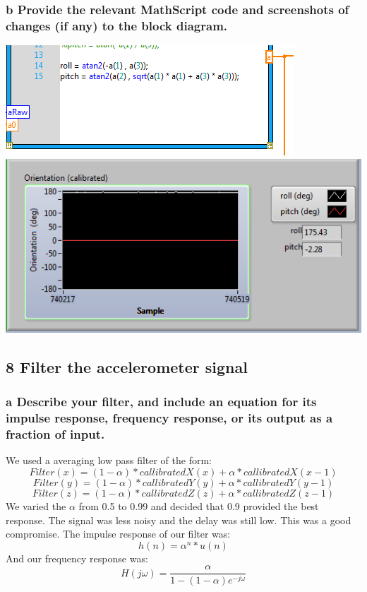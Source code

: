 \documentclass[10pt,a4paper]{article}
\begin{document}
    \subsubsection*{b Provide the relevant MathScript code and screenshots of changes (if any) to the block diagram.}
    \includegraphics{../lab1_data/lab1_7a.PNG} \\[1em] 
    \includegraphics{../lab1_data/lab1_7b.PNG} 
  \subsection*{8 Filter the accelerometer signal}
    \subsubsection*{a Describe your filter, and include an equation for its impulse response, frequency response, or its output as a fraction of input.}
      We used a averaging low pass filter of the form:
        \[Filter(x) = (1 - \alpha)*callibratedX(x) + \alpha*callibratedX(x-1)\]
        \[Filter(y) = (1 - \alpha)*callibratedY(y) + \alpha*callibratedY(y-1)\]
        \[Filter(z) = (1 - \alpha)*callibratedZ(z) + \alpha*callibratedZ(z-1)\]
      We varied the $\alpha$ from 0.5 to 0.99 and decided that 0.9 provided the best response. The signal was less noisy and the delay was still low. This was a good compromise. 
      The impulse response of our filter was:
        \[h(n) = \alpha^n*u(n)\]
      And our frequency response was:
        \[H(j\omega) = \frac{\alpha}{1 - (1 - \alpha)e^{-j\omega}}\]
\end{document}
